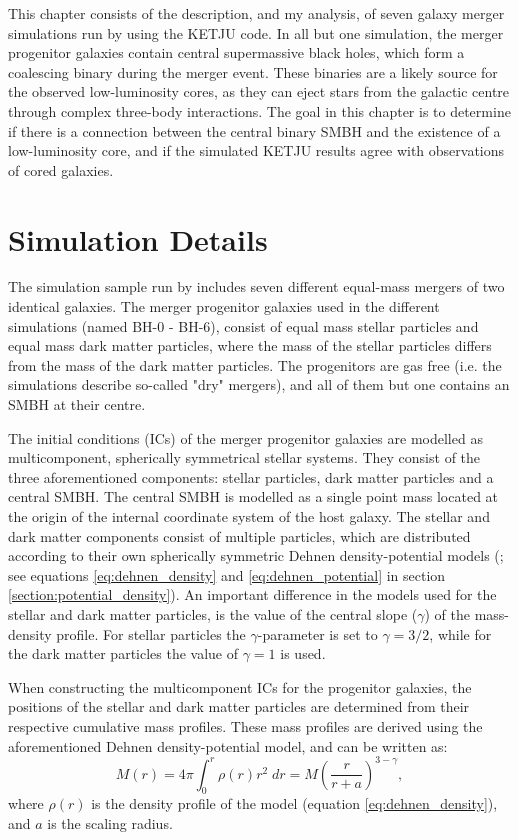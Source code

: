 \documentclass[english, twoside]{HYgradu}
\begin{document}
This chapter consists of the description, and my analysis, of seven galaxy merger simulations run by \cite{Rantala2018} using the KETJU code. In all but one simulation, the merger progenitor galaxies contain central supermassive black holes, which form a coalescing binary during the merger event. These binaries are a likely source for the observed low-luminosity cores, as they can eject stars from the galactic centre through complex three-body interactions. The goal in this chapter is to determine if there is a connection between the central binary SMBH and the existence of a low-luminosity core, and if the simulated KETJU results agree with observations of cored galaxies.

\section{Simulation Details}

The simulation sample run by \cite{Rantala2018} includes seven different equal-mass mergers of two identical galaxies. The merger progenitor galaxies used in the different simulations (named BH-0 - BH-6), consist of equal mass stellar particles and equal mass dark matter particles, where the mass of the stellar particles differs from the mass of the dark matter particles. The progenitors are gas free (i.e. the simulations describe so-called "dry" mergers), and all of them but one contains an SMBH at their centre.

The initial conditions (ICs) of the merger progenitor galaxies are modelled as multicomponent, spherically symmetrical stellar systems. They consist of the three aforementioned components: stellar particles, dark matter particles and a central SMBH. The central SMBH is modelled as a single point mass located at the origin of the internal coordinate system of the host galaxy. The stellar and dark matter components consist of multiple particles, which are distributed according to their own spherically symmetric Dehnen density-potential models (\citealt{Dehnen1993}; see equations \ref{eq:dehnen_density} and \ref{eq:dehnen_potential} in section \ref{section:potential_density}). An important difference in the models used for the stellar and dark matter particles, is the value of the central slope ($\gamma$) of the mass-density profile. For stellar particles the $\gamma$-parameter is set to $\gamma = 3/2$, while for the dark matter particles the value of $\gamma = 1$ is used.

When constructing the multicomponent ICs for the progenitor galaxies, the positions of the stellar and dark matter particles are determined from their respective cumulative mass profiles. These mass profiles are derived using the aforementioned Dehnen density-potential model, and can be written as:
\begin{equation}
M(r) = 4\pi \int^r_0 \rho(r)r^2 \;dr = M \left( \frac{r}{r+a} \right)^{3-\gamma}, \label{eq:cumulative_mass}
\end{equation}
where $\rho(r)$ is the density profile of the model (equation \ref{eq:dehnen_density}), and $a$ is the scaling radius.
\end{document}
